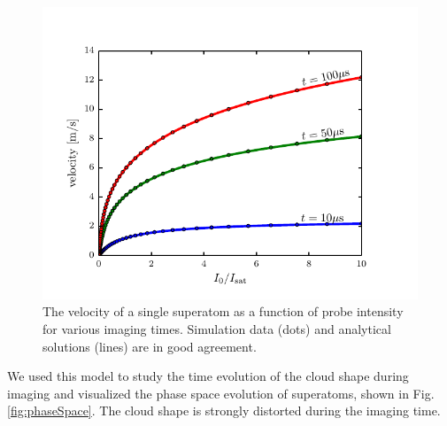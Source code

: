 \documentclass[12pt]{iopart}
\begin{document}
\begin{figure}
	\includegraphics{figure5.pdf}
\caption{The velocity of a single superatom as a function of probe intensity for various imaging times. Simulation data (dots) and analytical solutions (lines) are in good agreement.}  
\label{fig:oneAtomVel}
\end{figure}
\par We used this model to study the time evolution of the cloud shape during imaging and visualized the phase space evolution of superatoms, shown in Fig. \ref{fig:phaseSpace}. The cloud shape is strongly distorted during the imaging time. 
\end{document}
